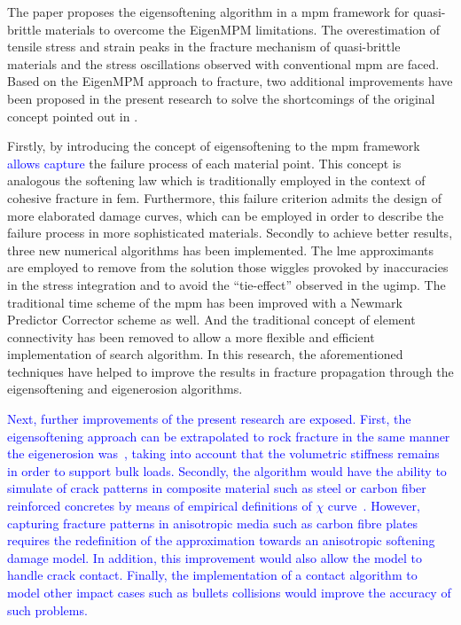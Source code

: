 \documentclass[preprint,12pt,a4paper]{elsarticle}
\begin{document}
The paper proposes the eigensoftening algorithm in a \acrshort{mpm} framework for quasi-brittle materials to overcome the EigenMPM \cite{Zhang_EE_2020} limitations. The overestimation of tensile 
stress and strain peaks in the fracture mechanism of quasi-brittle
materials and the stress oscillations observed with conventional
\acrshort{mpm} are faced. Based on the
EigenMPM approach to fracture, two additional improvements have been proposed in the present research to solve the shortcomings of the original concept pointed out in  \cite{Zhang_EE_2020}.

Firstly, by introducing the concept of eigensoftening to the \acrshort{mpm} framework \textcolor{blue}{allows capture} the failure process of each material point. This concept is analogous the softening law which is traditionally employed in the context
of cohesive fracture in \acrshort{fem}. Furthermore, this failure
criterion admits the design of more elaborated damage curves, which
can be employed in order to describe the failure process in more
sophisticated materials. Secondly to achieve better results, three new
numerical algorithms has been implemented. The \acrshort{lme}
approximants are employed to remove from
the solution those wiggles provoked by inaccuracies in the stress
integration and to avoid the ``tie-effect'' observed in the
\acrshort{ugimp}. The traditional time scheme of the \acrshort{mpm}
has been improved with a Newmark Predictor Corrector scheme as
well. And the traditional concept of element connectivity has been
removed to allow a more flexible and efficient implementation of
search algorithm. In this research, the aforementioned techniques have helped
to improve the results in fracture propagation through the
eigensoftening and eigenerosion algorithms.

\textcolor{blue}{Next, further improvements of the present research are exposed. First, the eigensoftening approach can be extrapolated to rock fracture in the same manner the eigenerosion was~\cite{Wang2017}, taking into account that the volumetric stiffness remains in order to support bulk loads. Secondly, the algorithm would have the ability to simulate of crack patterns in
composite material such as steel or carbon fiber reinforced concretes by means of empirical definitions of $\chi$ curve~\cite{Navas_2018_ES}. However, capturing fracture patterns in anisotropic media such as carbon fibre plates requires the redefinition of the approximation towards an anisotropic softening damage model. In addition, this improvement would also allow the model to handle crack contact. Finally, the implementation of a contact algorithm to model other impact cases such as bullets collisions would improve the accuracy of such problems.}
\end{document}
